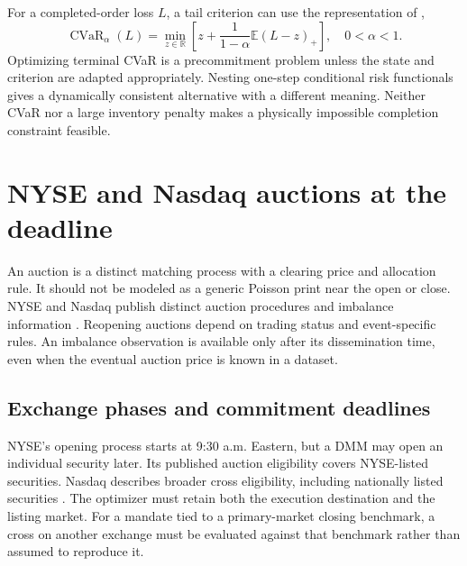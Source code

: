 \documentclass[11pt]{article}
\numberwithin{equation}{section}
\theoremstyle{definition}
\theoremstyle{remark}
\newcommand{\R}{\mathbb{R}}
\newcommand{\E}{\mathbb{E}}
\theoremstyle{definition}
\newcommand{\CVaR}{\operatorname{CVaR}}
\begin{document}
For a completed-order loss $L$, a tail criterion can use the representation
of \citet{rockafellar2000},
\begin{equation}\label{eq:cvar}
 \CVaR_\alpha(L)=\min_{z\in\R}
       \left[z+\frac{1}{1-\alpha}\E(L-z)_+\right],\quad 0<\alpha<1.
\end{equation}
Optimizing terminal CVaR is a precommitment problem unless the state and
criterion are adapted appropriately. Nesting one-step conditional risk
functionals gives a dynamically consistent alternative with a different
meaning. Neither CVaR nor a large inventory penalty makes a physically
impossible completion constraint feasible.



\section{NYSE and Nasdaq auctions at the deadline}\label{sec:auctions}

An auction is a distinct matching process with a clearing price and allocation
rule. It should not be modeled as a generic Poisson print near the open or
close. NYSE and Nasdaq publish distinct auction procedures and imbalance
information \citep{nyseauctions,nasdaqcross}. Reopening auctions depend on trading status and
event-specific rules. An imbalance observation is available only after its
dissemination time, even when the eventual auction price is known in a dataset.

\subsection{Exchange phases and commitment deadlines}

NYSE's opening process starts at 9:30 a.m. Eastern, but a DMM may open an
individual security later. Its published auction eligibility covers NYSE-listed
securities. Nasdaq describes broader cross eligibility, including nationally
listed securities \citep{nyseauctions,nasdaqcross}. The optimizer must retain
both the execution destination and the listing market. For a mandate tied to a
primary-market closing benchmark, a cross on another exchange must be evaluated
against that benchmark rather than assumed to reproduce it.
\end{document}
